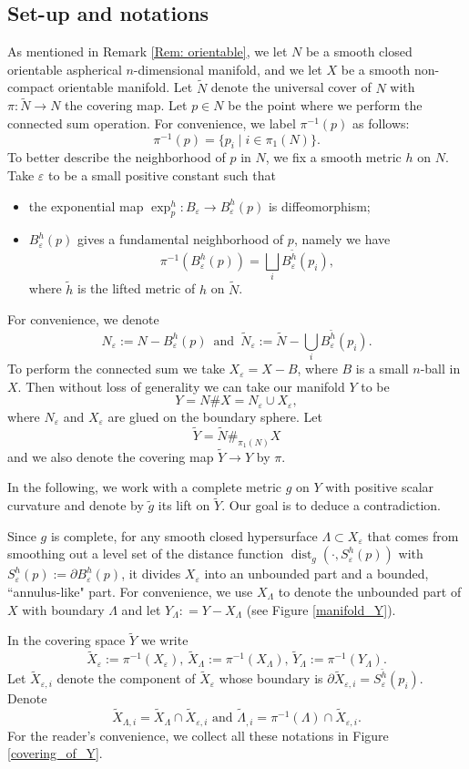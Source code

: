\documentclass[11pt,letterpaper]{amsart}
\numberwithin{equation}{section}
\theoremstyle{definition}
\DeclareMathOperator{\dist}{dist}
\newcommand{\ve}{\varepsilon}
\newcommand{\ti}[1]{\tilde{#1}}
\begin{document}
\subsection{Set-up and notations}\label{subsec: set-up and notations}
As mentioned in Remark \ref{Rem: orientable}, we let $N$ be a smooth closed orientable aspherical $n$-dimensional manifold, and we let $X$ be a smooth non-compact orientable manifold.
Let $\ti N$ denote the universal cover of $N$ with $\pi:\ti N\to N$ the covering map.
Let $p \in N$ be the point where we perform the connected sum operation.
For convenience, we label $\pi^{-1}(p)$ as follows:
$$
\pi^{-1}(p)= \{p_{i}\mid i\in\pi_1(N)\}.
$$
To better describe the neighborhood of $p$ in $N$, we fix a smooth metric $h$ on $N$. Take $\ve$ to be a small positive constant such that
\begin{itemize}\setlength{\itemsep}{1mm}
\item the exponential map $\exp_p^h:B_{\ve}\to B^h_{\ve}(p)$ is diffeomorphism;
\item $B^h_{\ve}(p)$ gives a fundamental neighborhood of $p$, namely we have
$$\pi^{-1}(B_{\ve}^h(p))=\bigsqcup_{i}B^{\ti h}_{\ve}(p_i),$$
where $\ti h$ is the lifted metric of $h$ on $\ti N$.
\end{itemize}
For convenience, we denote
$$
N_{\ve}:=N-B^h_{\ve}(p) \, \mbox{ and } \, \ti N_\ve:=\ti N-\bigcup_iB^{\ti h}_\ve(p_i).
$$
To perform the connected sum we take $X_\ve = X-B$, where $B$ is a small $n$-ball in $X$.
Then without loss of generality  we can take our manifold $Y$ to be $$Y = N \# X= N_\ve \cup X_\ve,$$ where $N_\ve$ and $X_\ve$ are glued on the boundary sphere.
Let
$$\ti Y = \ti N \#_{\pi_1(N)} X$$ and we also denote the covering map $\ti Y \to Y$ by $\pi$.

In the following, we work with a complete metric $g$ on $Y$ with positive scalar curvature and denote by $\ti g$ its lift on $\ti Y$. Our goal is to deduce a contradiction.

Since $g$ is complete, for any smooth closed hypersurface $\Lambda \subset X_\ve$
that comes from smoothing out a level set of the distance function $\dist_g(\cdot,S^h_{\ve}(p))$ with $S^h_{\ve}(p):=\partial B^h_{\ve}(p)$,
it divides $X_\ve$ into an unbounded part and a bounded, ``annulus-like" part. For convenience, we use $X_\Lambda$ to denote the unbounded part of $X$ with boundary $\Lambda$
and let $Y_\Lambda: = Y - X_\Lambda$ (see Figure \ref{manifold_Y}).

In the covering space $\tilde Y$ we write
$$\tilde X_\ve:=\pi^{-1}(X_{\ve}),\,\tilde X_\Lambda:=\pi^{-1}(X_{\Lambda}),\,\tilde Y_\Lambda:=\pi^{-1}(Y_{\Lambda}).$$
Let $\tilde X_{\ve,i}$ denote the component of $\ti X_\ve$ whose boundary is $\partial\tilde X_{\ve,i}=S^{\tilde h}_{\ve}(p_i)$. Denote
$$
\ti X_{\Lambda,i}=\ti X_{\Lambda}\cap \ti X_{\ve,i}\mbox{ and }\tilde \Lambda_{,i}=\pi^{-1}(\Lambda)\cap \ti X_{\ve,i}.
$$
For the reader's convenience, we collect all these notations in Figure \ref{covering_of_Y}.
\end{document}
